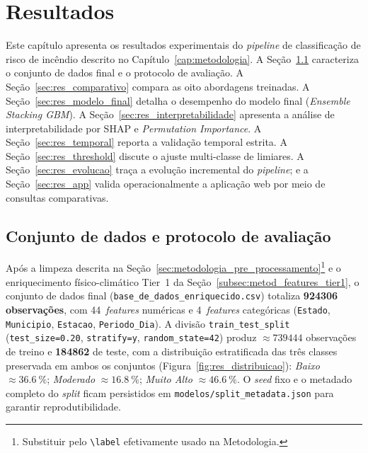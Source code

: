 %

\chapter{Resultados}
\label{cap:resultados}

Este capítulo apresenta os resultados experimentais do \emph{pipeline} de classificação de risco de incêndio descrito no Capítulo~\ref{cap:metodologia}. A Seção~\ref{sec:res_dataset} caracteriza o conjunto de dados final e o protocolo de avaliação. A Seção~\ref{sec:res_comparativo} compara as oito abordagens treinadas. A Seção~\ref{sec:res_modelo_final} detalha o desempenho do modelo final (\emph{Ensemble Stacking GBM}). A Seção~\ref{sec:res_interpretabilidade} apresenta a análise de interpretabilidade por SHAP e \emph{Permutation Importance}. A Seção~\ref{sec:res_temporal} reporta a validação temporal estrita. A Seção~\ref{sec:res_threshold} discute o ajuste multi-classe de limiares. A Seção~\ref{sec:res_evolucao} traça a evolução incremental do \emph{pipeline}; e a Seção~\ref{sec:res_app} valida operacionalmente a aplicação web por meio de consultas comparativas.

\section{Conjunto de dados e protocolo de avaliação}
\label{sec:res_dataset}

Após a limpeza descrita na Seção~\ref{sec:metodologia_pre_processamento}\footnote{Substituir pelo \texttt{\textbackslash label} efetivamente usado na Metodologia.} e o enriquecimento físico-climático Tier~1 da Seção~\ref{subsec:metod_features_tier1}, o conjunto de dados final (\texttt{base\_de\_dados\_enriquecido.csv}) totaliza \textbf{\num{924306} observações}, com 44~\emph{features} numéricas e 4~\emph{features} categóricas (\texttt{Estado}, \texttt{Municipio}, \texttt{Estacao}, \texttt{Periodo\_Dia}). A divisão \texttt{train\_test\_split} (\texttt{test\_size=0.20}, \texttt{stratify=y}, \texttt{random\_state=42}) produz \(\approx \num{739444}\) observações de treino e \textbf{\num{184862}} de teste, com a distribuição estratificada das três classes preservada em ambos os conjuntos (Figura~\ref{fig:res_distribuicao}): \emph{Baixo} \(\approx \SI{36,6}{\percent}\); \emph{Moderado} \(\approx \SI{16,8}{\percent}\); \emph{Muito Alto} \(\approx \SI{46,6}{\percent}\). O \emph{seed} fixo e o metadado completo do \emph{split} ficam persistidos em \texttt{modelos/split\_metadata.json} para garantir reprodutibilidade.

